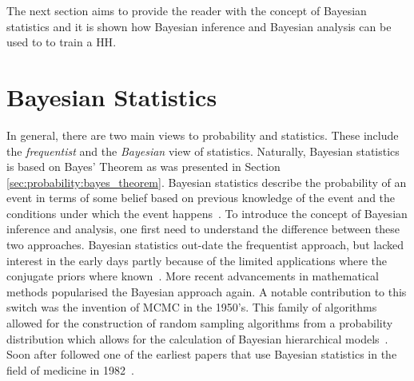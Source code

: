 The next section aims to provide the reader with the concept of Bayesian statistics and it is shown how Bayesian inference and Bayesian analysis can be used to to train a \acs{HH}.


\section{Bayesian Statistics}
\label{sec:probability:bayesian_statistics}

In general, there are two main views to probability and statistics. These include the \textit{frequentist} and the \textit{Bayesian} view of statistics. Naturally, Bayesian statistics is based on Bayes' Theorem as was presented in Section \ref{sec:probability:bayes_theorem}. Bayesian statistics describe the probability of an event in terms of some belief based on previous knowledge of the event and the conditions under which the event happens~\cite{ref:hackenberger:2019}. To introduce the concept of Bayesian inference and analysis, one first need to understand the difference between these two approaches. Bayesian statistics out-date the frequentist approach, but lacked interest in the early days partly because of the limited applications where the conjugate priors where known~\cite{ref:hackenberger:2019}. More recent advancements in mathematical methods popularised the Bayesian approach again. A notable contribution to this switch was the invention of \acs{MCMC} in the 1950's. This family of algorithms allowed for the construction of random sampling algorithms from a probability distribution which allows for the calculation of Bayesian hierarchical models~\cite{ref:hackenberger:2019}. Soon after followed one of the earliest papers that use Bayesian statistics in the field of medicine in 1982~\cite{ref:ashby:2006}.

